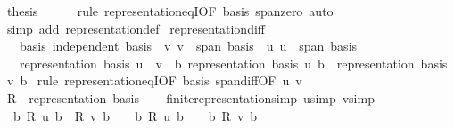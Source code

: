 \begin{isabellebody}
\ {\isacharquery}{\kern0pt}thesis\isanewline
\ \ \ \ \isamarkupfalse%
\ {\isacharparenleft}{\kern0pt}rule\ representation{\isacharunderscore}{\kern0pt}eqI{\isacharbrackleft}{\kern0pt}OF\ basis\ span{\isacharunderscore}{\kern0pt}zero{\isacharbrackright}{\kern0pt}{\isacharparenright}{\kern0pt}\ auto\isanewline
{}\isamarkupfalse%
\ {\isacharparenleft}{\kern0pt}simp\ add{\isacharcolon}{\kern0pt}\ representation{\isacharunderscore}{\kern0pt}def{\isacharparenright}{\kern0pt}%
\endisatagproof
{\isafoldproof}%
%
\isadelimproof
\isanewline
%
\endisadelimproof
\isanewline
{}\isamarkupfalse%
\ representation{\isacharunderscore}{\kern0pt}diff{\isacharcolon}{\kern0pt}\isanewline
\ \ \ basis{\isacharcolon}{\kern0pt}\ {\isachardoublequoteopen}independent\ basis{\isachardoublequoteclose}\ \ v{\isacharcolon}{\kern0pt}\ {\isachardoublequoteopen}v\ {\isasymin}\ span\ basis{\isachardoublequoteclose}\ \ u{\isacharcolon}{\kern0pt}\ {\isachardoublequoteopen}u\ {\isasymin}\ span\ basis{\isachardoublequoteclose}\isanewline
\ \ \ {\isachardoublequoteopen}representation\ basis\ {\isacharparenleft}{\kern0pt}u\ {\isacharminus}{\kern0pt}\ v{\isacharparenright}{\kern0pt}\ {\isacharequal}{\kern0pt}\ {\isacharparenleft}{\kern0pt}{\isasymlambda}b{\isachardot}{\kern0pt}\ representation\ basis\ u\ b\ {\isacharminus}{\kern0pt}\ representation\ basis\ v\ b{\isacharparenright}{\kern0pt}{\isachardoublequoteclose}\isanewline
%
\isadelimproof
%
\endisadelimproof
%
\isatagproof
{}\isamarkupfalse%
\ {\isacharparenleft}{\kern0pt}rule\ representation{\isacharunderscore}{\kern0pt}eqI{\isacharbrackleft}{\kern0pt}OF\ basis\ span{\isacharunderscore}{\kern0pt}diff{\isacharbrackleft}{\kern0pt}OF\ u\ v{\isacharbrackright}{\kern0pt}{\isacharbrackright}{\kern0pt}{\isacharparenright}{\kern0pt}\isanewline
\ \ \isamarkupfalse%
\ {\isacharquery}{\kern0pt}R\ {\isacharequal}{\kern0pt}\ {\isachardoublequoteopen}representation\ basis{\isachardoublequoteclose}\isanewline
\ \ \isamarkupfalse%
\ finite{\isacharunderscore}{\kern0pt}representation{\isacharbrackleft}{\kern0pt}simp{\isacharbrackright}{\kern0pt}\ u{\isacharbrackleft}{\kern0pt}simp{\isacharbrackright}{\kern0pt}\ v{\isacharbrackleft}{\kern0pt}simp{\isacharbrackright}{\kern0pt}\isanewline
\ \ \isamarkupfalse%
\ {\isacharasterisk}{\kern0pt}{\isacharcolon}{\kern0pt}\ {\isachardoublequoteopen}{\isacharbraceleft}{\kern0pt}b{\isachardot}{\kern0pt}\ {\isacharquery}{\kern0pt}R\ u\ b\ {\isacharminus}{\kern0pt}\ {\isacharquery}{\kern0pt}R\ v\ b\ {\isasymnoteq}\ {}{\isacharbraceright}{\kern0pt}\ {\isasymsubseteq}\ {\isacharbraceleft}{\kern0pt}b{\isachardot}{\kern0pt}\ {\isacharquery}{\kern0pt}R\ u\ b\ {\isasymnoteq}\ {}{\isacharbraceright}{\kern0pt}\ {\isasymunion}\ {\isacharbraceleft}{\kern0pt}b{\isachardot}{\kern0pt}\ {\isacharquery}{\kern0pt}R\ v\ b\ {\isasymnoteq}\ {}{\isacharbraceright}{\kern0pt}{\isachardoublequoteclose}\isanewline

\end{isabellebody}
